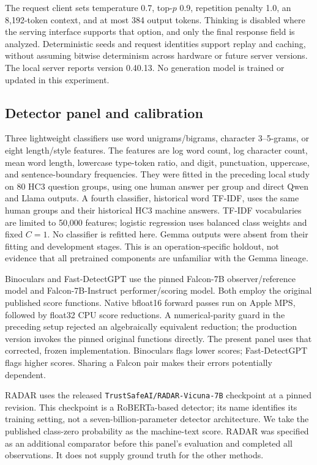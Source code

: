 The request client sets temperature 0.7, top-$p$ 0.9, repetition penalty 1.0, an 8,192-token context, and at most 384 output tokens. Thinking is disabled where the serving interface supports that option, and only the final response field is analyzed. Deterministic seeds and request identities support replay and caching, without assuming bitwise determinism across hardware or future server versions. The local server reports version 0.40.13. No generation model is trained or updated in this experiment.

\subsection{Detector panel and calibration}
Three lightweight classifiers use word unigrams/bigrams, character 3--5-grams, or eight length/style features. The features are log word count, log character count, mean word length, lowercase type-token ratio, and digit, punctuation, uppercase, and sentence-boundary frequencies. They were fitted in the preceding local study on 80 HC3 question groups, using one human answer per group and direct Qwen and Llama outputs. A fourth classifier, historical word TF-IDF, uses the same human groups and their historical HC3 machine answers. TF-IDF vocabularies are limited to 50,000 features; logistic regression uses balanced class weights and fixed $C=1$. No classifier is refitted here. Gemma outputs were absent from their fitting and development stages. This is an operation-specific holdout, not evidence that all pretrained components are unfamiliar with the Gemma lineage.

Binoculars and Fast-DetectGPT use the pinned Falcon-7B observer/reference model and Falcon-7B-Instruct performer/scoring model. Both employ the original published score functions. Native bfloat16 forward passes run on Apple MPS, followed by float32 CPU score reductions. A numerical-parity guard in the preceding setup rejected an algebraically equivalent reduction; the production version invokes the pinned original functions directly. The present panel uses that corrected, frozen implementation. Binoculars flags lower scores; Fast-DetectGPT flags higher scores. Sharing a Falcon pair makes their errors potentially dependent.

RADAR uses the released \texttt{TrustSafeAI/RADAR-Vicuna-7B} checkpoint at a pinned revision. This checkpoint is a RoBERTa-based detector; its name identifies its training setting, not a seven-billion-parameter detector architecture. We take the published class-zero probability as the machine-text score. RADAR was specified as an additional comparator before this panel's evaluation and completed all observations. It does not supply ground truth for the other methods.

